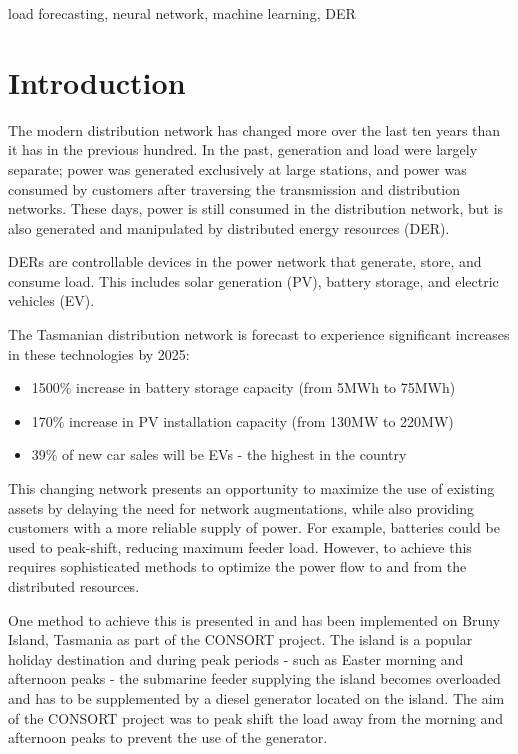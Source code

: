 \documentclass[conference]{IEEEtran}
\begin{document}
\begin{IEEEkeywords}
load forecasting, neural network, machine learning, DER
\end{IEEEkeywords}

\section{Introduction}
The modern distribution network has changed more over the last ten years than it has in the previous hundred.
In the past, generation and load were largely separate; power was generated exclusively at large stations, and power was consumed by customers after traversing the transmission and distribution networks. 
These days, power is still consumed in the distribution network, but is also generated and manipulated by distributed energy resources (DER). 
\par
DERs are controllable devices in the power network that generate, store, and consume load. 
This includes solar generation (PV), battery storage, and electric vehicles (EV). 
\par
The Tasmanian distribution network is forecast to experience significant increases in these technologies by 2025: \\
\begin{itemize}
	\item 1500\% increase in battery storage capacity (from 5MWh to 75MWh) \cite{Jacobs2017}
	\item 170\% increase in PV installation capacity (from 130MW to 220MW) \cite{Jacobs2017}
	\item 39\% of new car sales will be EVs - the highest in the country \cite{AEMO2016}
\end{itemize}

This changing network presents an opportunity to maximize the use of existing assets by delaying the need for network augmentations, while also providing customers with a more reliable supply of power.
For example, batteries could be used to peak-shift, reducing maximum feeder load.
However, to achieve this requires sophisticated methods to optimize the power flow to and from the distributed resources.
\par
One method to achieve this is presented in \cite{Scott2014} and has been implemented on Bruny Island, Tasmania as part of the CONSORT project.
The island is a popular holiday destination and during peak periods - such as Easter morning and afternoon peaks - the submarine feeder supplying the island becomes overloaded and has to be supplemented by a diesel generator located on the island.
The aim of the CONSORT project was to peak shift the load away from the morning and afternoon peaks to prevent the use of the generator.
\end{document}
